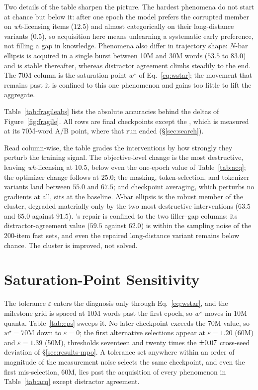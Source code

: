 Two details of the table sharpen the picture. The hardest phenomena do
not start at chance but below it: after one epoch the model prefers the
corrupted member on \emph{wh}-licensing items ($12.5$) and almost
categorically on their long-distance variants ($0.5$), so acquisition
here means unlearning a systematic early preference, not filling a gap in
knowledge. Phenomena also differ in trajectory shape: $N$-bar ellipsis is
acquired in a single burst between 10M and 30M words ($53.5$ to $83.0$)
and is stable thereafter, whereas distractor agreement climbs steadily to
the end. The 70M column is the saturation point $w^{\star}$ of
Eq.~\ref{eq:wstar}; the movement that remains past it is confined to this
one phenomenon and gains too little to lift the aggregate.



Table~\ref{tab:fragileabs} lists the absolute accuracies behind the
deltas of Figure~\ref{fig:fragile}. All rows are final checkpoints except
the \Lcontrast{}, which is measured at its 70M-word A/B point, where that
run ended (\S\ref{sec:search}).

Read column-wise, the table grades the interventions by how strongly they
perturb the training signal. The objective-level change is the most
destructive, leaving \emph{wh}-licensing at $10.5$, below even the
one-epoch value of Table~\ref{tab:acq}; the optimizer change follows at
$25.0$; the masking, token-selection, and tokenizer variants land between
$55.0$ and $67.5$; and checkpoint averaging, which perturbs no gradients
at all, sits at the baseline. $N$-bar ellipsis is the robust member of
the cluster, degraded materially only by the two most destructive
interventions ($63.5$ and $65.0$ against $91.5$). \MPO{}'s repair is
confined to the two filler--gap columns: its distractor-agreement value
($59.5$ against $62.0$) is within the sampling noise of the 200-item fast
sets, and even the repaired long-distance variant remains below chance.
The cluster is improved, not solved.

\section{Saturation-Point Sensitivity}
\label{sec:app-eps}

The tolerance $\varepsilon$ enters the diagnosis only through
Eq.~\ref{eq:wstar}, and the milestone grid is spaced at 10M words past the
first epoch, so $w^{\star}$ moves in 10M quanta.
Table~\ref{tab:eps} sweeps it. No later checkpoint exceeds the 70M value,
so $w^{\star}=\text{70M}$ down to $\varepsilon=0$; the first alternative
selections appear at $\varepsilon=1.20$ (60M) and $\varepsilon=1.39$
(50M), thresholds seventeen and twenty times the $\pm0.07$
cross-seed deviation of \S\ref{sec:results-mpo}. A tolerance set anywhere
within an order of magnitude of the measurement noise selects the same
checkpoint, and even the first mis-selection, 60M, lies past the
acquisition of every phenomenon in Table~\ref{tab:acq} except distractor
agreement.

